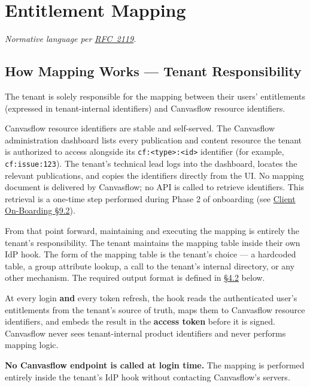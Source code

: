 \section{Entitlement Mapping}\label{sec:entitlement-mapping}

\textit{Normative language per \href{https://tools.ietf.org/html/rfc2119}{RFC~2119}.}

\subsection{How Mapping Works --- Tenant Responsibility}

The tenant is solely responsible for the mapping between their users' entitlements
(expressed in tenant-internal identifiers) and Canvasflow resource identifiers.

Canvasflow resource identifiers are stable and self-served. The Canvasflow administration 
dashboard lists every publication and content resource the tenant is authorized to access 
alongside its \texttt{cf:<type>:<id>} identifier (for example, \texttt{cf:issue:123}). 
The tenant's technical lead logs into the dashboard, locates the relevant publications, and 
copies the identifiers directly from the UI. No mapping document is delivered by 
Canvasflow; no API is called to retrieve identifiers. This retrieval is a one-time 
step performed during Phase 2 of onboarding 
(see \hyperref[sec:canvasflow-side-setup]{Client On-Boarding \S9.2}).


From that point forward, maintaining and executing the mapping is entirely the tenant's
responsibility. The tenant maintains the mapping table inside their own IdP hook. The
form of the mapping table is the tenant's choice --- a hardcoded table, a group attribute
lookup, a call to the tenant's internal directory, or any other mechanism. The required
output format is defined in \hyperref[sec:mandatory-value-format]{\S4.2} below.

At every login \textbf{and} every token refresh, the hook reads the authenticated user's
entitlements from the tenant's source of truth, maps them to Canvasflow resource
identifiers, and embeds the result in the \textbf{access token} before it is signed.
Canvasflow never sees tenant-internal product identifiers and never performs mapping
logic.

\textbf{No Canvasflow endpoint is called at login time.} The mapping is performed
entirely inside the tenant's IdP hook without contacting Canvasflow's servers.

